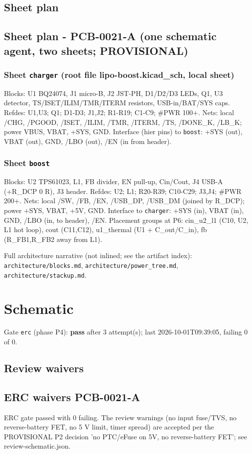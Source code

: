 \documentclass[11pt]{article}
\begin{document}
\subsection*{Sheet plan}
\subsection*{Sheet plan - PCB-0021-A (one schematic agent, two sheets; PROVISIONAL)}
\subsubsection*{Sheet \texttt{charger} (root file lipo-boost.kicad\_sch, local sheet)}
Blocks: U1 BQ24074, J1 micro-B, J2 JST-PH, D1/D2/D3 LEDs, Q1, U3 detector, TS/ISET/ILIM/TMR/ITERM resistors, USB-in/BAT/SYS caps. Refdes: U1,U3; Q1; D1-D3; J1,J2; R1-R19; C1-C9; \#PWR 100+. Nets: local /CHG, /PGOOD, /ISET, /ILIM, /TMR, /ITERM, /TS, /DONE\_K, /LB\_K; power VBUS, VBAT, +SYS, GND. Interface (hier pins) to \texttt{boost}: +SYS (out), VBAT (out), GND, /LBO (out), /EN (in from header).

\subsubsection*{Sheet \texttt{boost}}
Blocks: U2 TPS61023, L1, FB divider, EN pull-up, Cin/Cout, J4 USB-A (+R\_DCP 0 R), J3 header. Refdes: U2; L1; R20-R39; C10-C29; J3,J4; \#PWR 200+. Nets: local /SW, /FB, /EN, /USB\_DP, /USB\_DM (joined by R\_DCP); power +SYS, VBAT, +5V, GND. Interface to \texttt{charger}: +SYS (in), VBAT (in), GND, /LBO (in, to header), /EN. Placement groups at P6: cin\_u2\_l1 (C10, U2, L1 hot loop), cout (C11,C12), u1\_thermal (U1 + C\_out/C\_in), fb (R\_FB1,R\_FB2 away from L1).

Full architecture narrative (not inlined; see the artifact index): \texttt{architecture/blocks.md}, \texttt{architecture/power\_tree.md}, \texttt{architecture/stackup.md}.
\section{Schematic}
Gate \texttt{erc} (phase P4): \textbf{pass} after 3 attempt(s); last 2026-10-01T09:39:05, failing 0 of 0.
\subsection*{Review waivers}
\subsection*{ERC waivers PCB-0021-A}
ERC gate passed with 0 failing. The review warnings (no input fuse/TVS, no reverse-battery FET, no 5 V limit, timer spread) are accepted per the PROVISIONAL P2 decision 'no PTC/eFuse on 5V, no reverse-battery FET'; see review-schematic.json.
\end{document}
